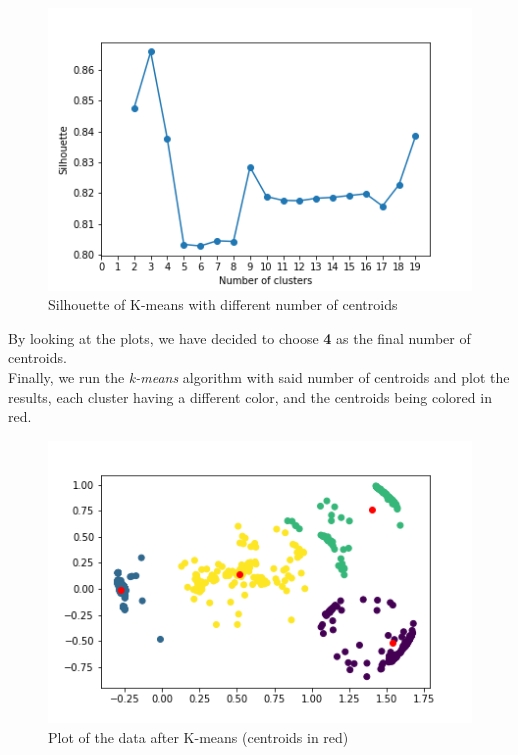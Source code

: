 \documentclass[idxtotoc,hyperref,openany]{labbook} %
\begin{document}
\begin{figure}[h]
\includegraphics[width=0.9\linewidth]{KMeans_Silhouette_Accelerometer_Day1.png}
\setlength\belowcaptionskip{-10pt}
\caption{Silhouette of K-means with different number of centroids}
\label{K-means silhouette 1}
\end{figure}
By looking at the plots, we have decided to choose \textbf{4} as the final number of centroids.\\

Finally, we run the \textit{k-means} algorithm with said number of centroids and plot the results, each cluster having a different color, and the centroids being colored in red.\\

\begin{figure}[h]
\includegraphics[width=0.9\linewidth]{KMeans_Plot_Accelerometer_Day1.png}
\setlength\belowcaptionskip{-10pt}
\caption{Plot of the data after K-means (centroids in red)}
\label{K-Means plot 1}
\end{figure}
\end{document}
